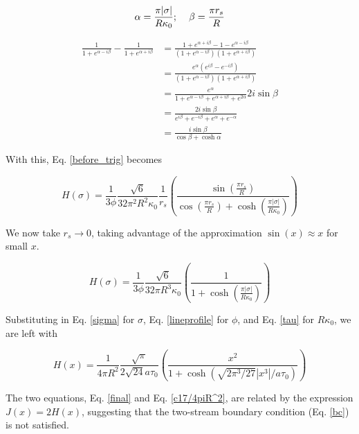 \documentclass[onecolumn]{aastex63}
\begin{document}
\begin{equation}
    \alpha = \frac{\pi |\sigma|}{R\kappa_0}; \hspace{0.4cm} \beta = \frac{\pi r_s}{R}
\end{equation}

\begin{equation}
    \begin{split}
    \frac{1}{1+e^{\alpha - i\beta}} - \frac{1}{1+e^{\alpha + i\beta}} &= \frac{1+e^{\alpha + i\beta} - 1 - e^{\alpha - i\beta}}{\left(1+e^{\alpha - i\beta}\right)\left(1+e^{\alpha + i\beta}\right)} \\
    &= \frac{e^{\alpha}\left(e^{i\beta} - e^{- i\beta}\right)}{\left(1+e^{\alpha - i\beta}\right)\left(1+e^{\alpha + i\beta}\right)} \\
    &= \frac{e^{\alpha}}{1 + e^{\alpha - i\beta} + e^{\alpha + i\beta} + e^{2\alpha}} 2i \sin{\beta} \\
    &= \frac{2i \sin{\beta}}{e^{i\beta} + e^{- i\beta} + e^{\alpha} + e^{-\alpha}} \\
    &= \frac{i \sin{\beta}}{\cos{\beta} + \cosh{\alpha}}
    \end{split}
\end{equation}

With this, Eq. \ref{before_trig} becomes

\begin{equation} \label{after_trig}
    H(\sigma) = \frac{1}{3 \phi} \frac{\sqrt{6}}{32 \pi^2 R^2 \kappa_0} \frac{1}{r_s} \left(\frac{\sin{\left(\frac{\pi r_s}{R}\right)}}{\cos{\left(\frac{\pi r_s}{R}\right)} + \cosh{\left(\frac{\pi |\sigma|}{R\kappa_0}\right)}}\right)
\end{equation}

We now take $r_s \rightarrow 0$, taking advantage of the approximation $\sin(x) \approx x$ for small $x$.

\begin{equation}
    H(\sigma) = \frac{1}{3 \phi} \frac{\sqrt{6}}{32 \pi R^3 \kappa_0} \left(\frac{1}{1 + \cosh{\left(\frac{\pi |\sigma|}{R\kappa_0}\right)}}\right)
\end{equation}

Substituting in Eq. \ref{sigma} for $\sigma$, Eq. \ref{lineprofile} for $\phi$, and Eq. \ref{tau} for $R \kappa_0$, we are left with

\begin{equation} \label{final}
    H(x) = \frac{1}{4\pi R^2}\frac{\sqrt{\pi}}{2\sqrt{24}a\tau_0} \left(\frac{x^2}{1 + \cosh{\left(\sqrt{2\pi^3/27}|x^3|/a\tau_0\right)}}\right)
\end{equation}

The two equations, Eq. \ref{final} and Eq. \ref{c17/4piR^2}, are related by the expression $J(x) = 2 H(x)$, suggesting that the two-stream boundary condition (Eq. \ref{bc}) is not satisfied.

{}

\end{document}
